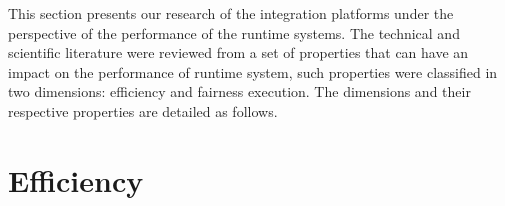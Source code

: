 \label{cap:stateofart}
\noindent 
This section presents our research of the integration platforms under the perspective of the performance of the runtime systems. The technical and scientific literature were reviewed from a set of properties that can have an impact on the performance of runtime system, such properties were classified in two dimensions: efficiency and fairness execution. The dimensions and their respective properties are detailed as follows.

\section{Efficiency}
\label{sec:efficiency}

